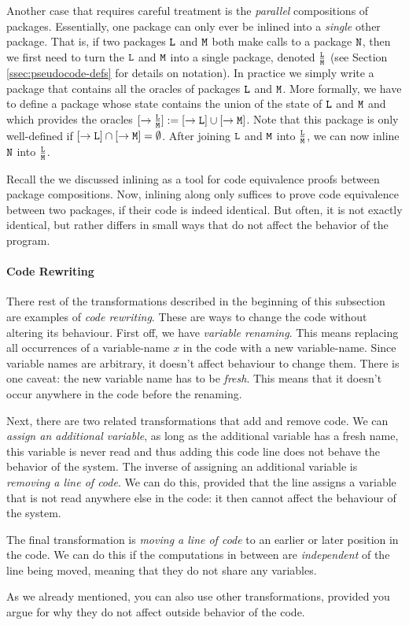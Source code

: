 Another case that requires careful treatment is the \emph{parallel} compositions of packages. Essentially, one package can only ever be inlined into a \emph{single} other package. That is, if two packages $\text{\texttt{L}}$ and $\text{\texttt{M}}$ both make calls to a package $\text{\texttt{N}}$, then we first need to turn the $\text{\texttt{L}}$ and $\text{\texttt{M}}$ into a single package, denoted $\tfrac{\text{\texttt{L}}}{\text{\texttt{M}}}$ (see Section \ref{ssec:pseudocode-defs} for details on notation). In practice we simply write a package that contains all the oracles of packages $\text{\texttt{L}}$ and $\text{\texttt{M}}$. More formally, we have to define a package whose state contains the union of the state of $\text{\texttt{L}}$ and $\text{\texttt{M}}$ and which provides the oracles $[\rightarrow\tfrac{\text{\texttt{L}}}{\text{\texttt{M}}}]:=[\rightarrow\text{\texttt{L}}]\cup[\rightarrow\text{\texttt{M}}]$. Note that this package is only well-defined if $[\rightarrow\text{\texttt{L}}]\cap[\rightarrow\text{\texttt{M}}]=\emptyset$. After joining $\text{\texttt{L}}$ and $\text{\texttt{M}}$ into $\tfrac{\text{\texttt{L}}}{\text{\texttt{M}}}$, we can now inline $\text{\texttt{N}}$ into $\tfrac{\text{\texttt{L}}}{\text{\texttt{M}}}$.

Recall the we discussed inlining as a tool for code equivalence proofs between package compositions. Now, inlining along only suffices to prove code equivalence between two packages, if their code is indeed identical. But often, it is not exactly identical, but rather differs in small ways that do not affect the behavior of the program.

\paragraph{Code Rewriting}
There rest of the transformations described in the beginning of this subsection are examples of \emph{code rewriting}. These are ways to change the code without altering its behaviour. First off, we have \emph{variable renaming}. This means replacing all occurrences of a variable-name $x$ in the code with a new variable-name. Since variable names are arbitrary, it doesn't affect behaviour to change them. There is one caveat: the new variable name has to be \emph{fresh}. This means that it doesn't occur anywhere in the code before the renaming.

Next, there are two related transformations that add and remove code. We can \emph{assign an additional variable}, as long as the additional variable has a fresh name, this variable is never read and thus adding this code line does not behave the behavior of the system. The inverse of assigning an additional variable is \emph{removing a line of code}. We can do this, provided that the line assigns a variable that is not read anywhere else in the code: it then cannot affect the behaviour of the system. 

The final transformation is \emph{moving a line of code} to an earlier or later position in the code. We can do this if the computations in between are \emph{independent} of the line being moved, meaning that they do not share any variables.

As we already mentioned, you can also use other transformations, provided you argue for why they do not affect outside behavior of the code.
